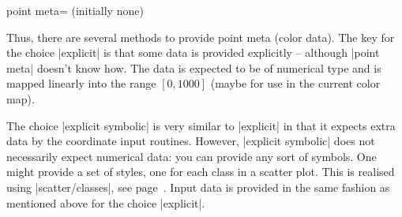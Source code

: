 \begin{pgfplotskey}{point meta= (initially none)}
\begin{description}
\begin{codeexample}
\end{codeexample}
		Thus, there are several methods to provide point meta (color data). The key for the choice |explicit| is that some data is provided explicitly -- although |point meta| doesn't know how. The data is expected to be of numerical type and is mapped linearly into the range $[0,1000]$ (maybe for use in the current color map).

		\item[\declaretext{explicit symbolic}] The choice |explicit symbolic| is very similar to |explicit| in that it expects extra data by the coordinate input routines. However, |explicit symbolic| does not necessarily expect numerical data: you can provide any sort of symbols. One might provide a set of styles, one for each class in a scatter plot. This is realised using |scatter/classes|, see page~\pageref{pgfplots:scatterclasses}. Input data is provided in the same fashion as mentioned above for the choice |explicit|. 
		

\end{description}
\end{pgfplotskey}
